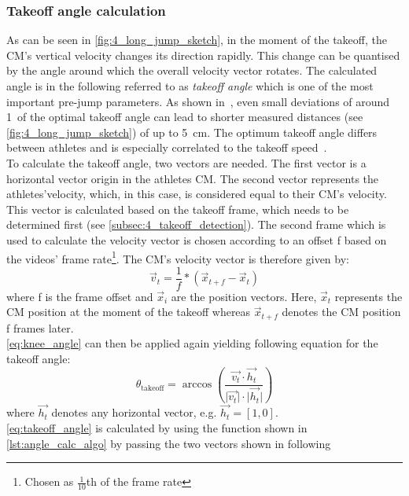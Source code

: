 \subsubsection*{Takeoff angle calculation}
As can be seen in \autoref{fig:4_long_jump_sketch}, in the moment of the
takeoff, the \ac{CM}'s vertical velocity changes its direction rapidly.
This change can be quantised by the angle around which the overall
velocity vector rotates.
The calculated angle is in the following referred to as \textit{takeoff angle}
which is one of the most important pre-jump parameters.
As shown in~\cite{seyfarth_optimum_2000}, even small deviations of around
1\textdegree\ of the optimal takeoff angle can lead to shorter measured
distances (see \autoref{fig:4_long_jump_sketch}) of up to 5~cm.
The optimum takeoff angle differs between athletes and is especially
correlated to the takeoff speed~\cite{tsuboi_mathematical_2010}.\\
To calculate the takeoff angle, two vectors are needed.
The first vector is a horizontal vector origin in the athletes \ac{CM}.
The second vector represents the athletes'velocity, which, in this case, 
is considered equal to their \ac{CM}'s velocity.
This vector is calculated based on the takeoff frame, which needs to be
determined first (see \autoref{subsec:4_takeoff_detection}).
The second frame which is used to calculate the velocity vector is chosen
according to an offset f based on the videos' frame
rate\footnote{Chosen as $\frac{1}{10}$th of the frame rate}.
The \ac{CM}'s velocity vector is therefore given by:
\begin{equation}
    \vec{{}v}_t = \frac{1}{f} * (\vec{{}x}_{t+f} - \vec{{}x}_t)
\end{equation}
where f is the frame offset and $\vec{{}x}_i$ are the position vectors.
Here, $\vec{{}x}_t$ represents the \ac{CM} position at the moment of the takeoff
whereas $\vec{{}x}_{t+f}$ denotes the \ac{CM} position f frames later.\\
\autoref{eq:knee_angle} can then be applied again yielding following equation
for the takeoff angle:
\begin{equation}\label{eq:takeoff_angle}
    \theta_{\text{takeoff}} = \arccos\left(\frac{\vec{v_t} \cdot \vec{h_t}}{\lvert\vec{v_t}\rvert \cdot \lvert\vec{h_t}\rvert}\right)
\end{equation}
where $\vec{h_t}$ denotes any horizontal vector, e.g. $\vec{h_t} = [1, 0]$.\\
\autoref{eq:takeoff_angle} is calculated by using the function shown in
\autoref{lst:angle_calc_algo} by passing the two vectors shown in following
